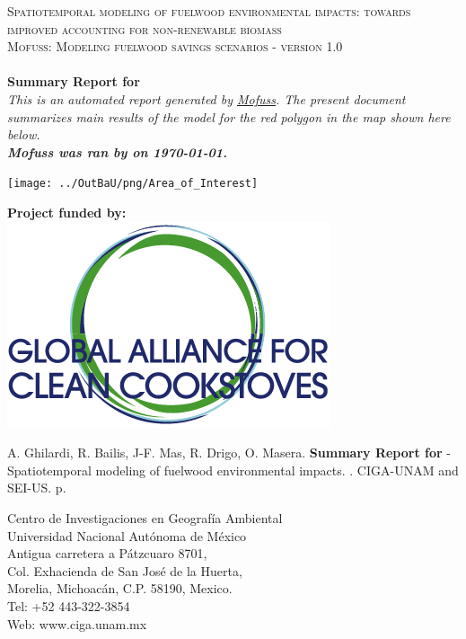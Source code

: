 \begin{titlepage}
\begin{center}
	\textsc{\Large Spatiotemporal modeling of fuelwood environmental impacts: towards improved accounting for non-renewable biomass}\\[0.5cm]

\textsc{\Large Mofuss: Modeling fuelwood savings scenarios - version 1.0}\\[0.25cm]

\HRule \\[0.25cm]
{ \huge \bfseries Summary Report for }
\HRule \\[0.25cm]

\emph{\large This is an automated report generated by \href{http://redd.ciga.unam.mx/nrb/index.php/models}{Mofuss}. The present document summarizes main results of the model for the red polygon in the map shown here below.\\ \textbf{Mofuss was ran by on \today.}} 

\texttt{[image: ../OutBaU/png/Area\_of\_Interest]}

\textbf{Project funded by:}\\
\includegraphics[width=0.2\linewidth]{../LULCC/Wizard_imgs/GACC}
\end{center}


\pagebreak 

\begin{flushleft}

A. Ghilardi, R. Bailis, J-F. Mas, R. Drigo, O. Masera. \textbf{Summary Report for }- Spatiotemporal modeling of fuelwood environmental impacts. \the\year. CIGA-UNAM and SEI-US. \pageref{lastpage} p.
\bigskip

Centro de Investigaciones en Geografía Ambiental \\
Universidad Nacional Autónoma de México \\
Antigua carretera a Pátzcuaro 8701, \\
Col. Exhacienda de San José de la Huerta, \\
Morelia, Michoacán, C.P. 58190, Mexico. \\
Tel: +52 443-322-3854 \\
Web: www.ciga.unam.mx
\bigskip


\end{flushleft}
\end{titlepage}

